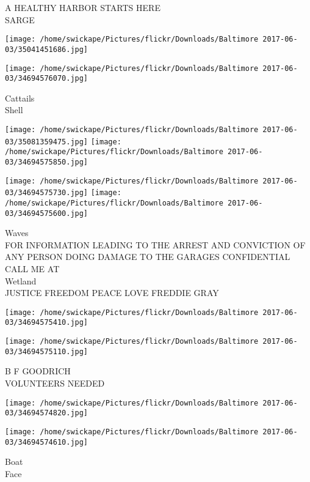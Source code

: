 \documentclass[10pt,letterpaper]{article}
\begin{document}
A HEALTHY HARBOR STARTS HERE\\
SARGE\\
\pagebreak

\texttt{[image: /home/swickape/Pictures/flickr/Downloads/Baltimore 2017-06-03/35041451686.jpg]}

\vspace{0.25in}
\texttt{[image: /home/swickape/Pictures/flickr/Downloads/Baltimore 2017-06-03/34694576070.jpg]}

Cattails\\
Shell\\
\pagebreak

\texttt{[image: /home/swickape/Pictures/flickr/Downloads/Baltimore 2017-06-03/35081359475.jpg]}
\texttt{[image: /home/swickape/Pictures/flickr/Downloads/Baltimore 2017-06-03/34694575850.jpg]}

\texttt{[image: /home/swickape/Pictures/flickr/Downloads/Baltimore 2017-06-03/34694575730.jpg]}
\texttt{[image: /home/swickape/Pictures/flickr/Downloads/Baltimore 2017-06-03/34694575600.jpg]}

Waves\\
FOR INFORMATION LEADING TO THE ARREST AND CONVICTION OF ANY PERSON DOING DAMAGE TO THE GARAGES CONFIDENTIAL CALL ME AT\\
Wetland\\
JUSTICE FREEDOM PEACE LOVE FREDDIE GRAY\\
\pagebreak

\texttt{[image: /home/swickape/Pictures/flickr/Downloads/Baltimore 2017-06-03/34694575410.jpg]}

\vspace{0.25in}
\texttt{[image: /home/swickape/Pictures/flickr/Downloads/Baltimore 2017-06-03/34694575110.jpg]}

B F GOODRICH\\
VOLUNTEERS NEEDED\\
\pagebreak

\texttt{[image: /home/swickape/Pictures/flickr/Downloads/Baltimore 2017-06-03/34694574820.jpg]}

\vspace{0.25in}
\texttt{[image: /home/swickape/Pictures/flickr/Downloads/Baltimore 2017-06-03/34694574610.jpg]}

Boat\\
Face\\
\pagebreak
\end{document}
